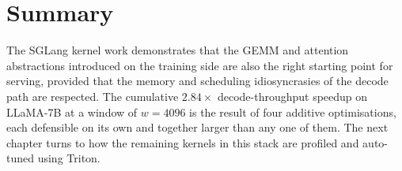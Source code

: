 \section{Summary}\label{sec:sglang_summary}
The SGLang kernel work demonstrates that the GEMM and attention
abstractions introduced on the training side are also the right
starting point for serving, provided that the memory and
scheduling idiosyncrasies of the decode path are respected. The
cumulative $2.84\times$ decode-throughput speedup on LLaMA-7B at
a window of $w = 4096$ is the result of four additive
optimisations, each defensible on its own and together larger
than any one of them. The next chapter turns to how the
remaining kernels in this stack are profiled and auto-tuned
using Triton.
